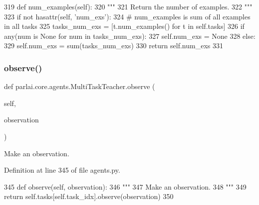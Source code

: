 \begin{DoxyCode}
319     \textcolor{keyword}{def }num\_examples(self):
320         \textcolor{stringliteral}{"""}
321 \textcolor{stringliteral}{        Return the number of examples.}
322 \textcolor{stringliteral}{        """}
323         \textcolor{keywordflow}{if} \textcolor{keywordflow}{not} hasattr(self, \textcolor{stringliteral}{'num\_exs'}):
324             \textcolor{comment}{# num\_examples is sum of all examples in all tasks}
325             tasks\_num\_exs = [t.num\_examples() \textcolor{keywordflow}{for} t \textcolor{keywordflow}{in} self.tasks]
326             \textcolor{keywordflow}{if} any(num \textcolor{keywordflow}{is} \textcolor{keywordtype}{None} \textcolor{keywordflow}{for} num \textcolor{keywordflow}{in} tasks\_num\_exs):
327                 self.num\_exs = \textcolor{keywordtype}{None}
328             \textcolor{keywordflow}{else}:
329                 self.num\_exs = sum(tasks\_num\_exs)
330         \textcolor{keywordflow}{return} self.num\_exs
331 
\end{DoxyCode}
\mbox{\label{classparlai_1_1core_1_1agents_1_1MultiTaskTeacher_a42290221cabd0f1ca21cb87a2228af10}} 
\subsubsection{\texorpdfstring{observe()}{observe()}}
{\footnotesize\ttfamily def parlai.\+core.\+agents.\+Multi\+Task\+Teacher.\+observe (\begin{DoxyParamCaption}\item[{}]{self,  }\item[{}]{observation }\end{DoxyParamCaption})}

\begin{DoxyVerb}Make an observation.
\end{DoxyVerb}
 

Definition at line 345 of file agents.\+py.


\begin{DoxyCode}
345     \textcolor{keyword}{def }observe(self, observation):
346         \textcolor{stringliteral}{"""}
347 \textcolor{stringliteral}{        Make an observation.}
348 \textcolor{stringliteral}{        """}
349         \textcolor{keywordflow}{return} self.tasks[self.task\_idx].observe(observation)
350 
\end{DoxyCode}
\mbox{\label{classparlai_1_1core_1_1agents_1_1MultiTaskTeacher_ac93a499c6438ee1b57d0ad6a702851ae}} 
